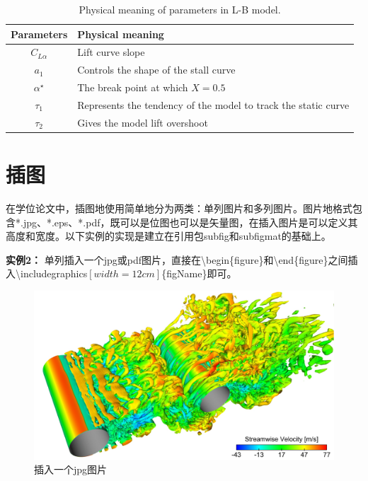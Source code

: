 \begin{table}                %
\centering
 \begin{center}
  \caption{Physical meaning of parameters in L-B model.\cite{Pattinson:2013_postall_oscillation}}
  \label{tab:LB-parameters}
  \begin{tabular}{cl}
       \\\hline
       Parameters & Physical meaning       \\\hline
       $C_{L\alpha}$ & Lift curve slope \\
       $a_{1}$ & Controls the shape of the stall curve \\
       $\alpha^{\star}$ & The break point at which $X=0.5$ \\
       $\tau_{1}$ & Represents the tendency of the model to track the static curve \\
       $\tau_{2}$ & Gives the model lift overshoot \\\hline
  \end{tabular}
 \end{center}
\end{table}

\section{插图}
\label{sec:fig}

在学位论文中，插图地使用简单地分为两类：单列图片和多列图片。图片地格式包含*.jpg、*.eps、*.pdf，既可以是位图也可以是矢量图，在插入图片是可以定义其高度和宽度。以下实例的实现是建立在引用包subfig和subfigmat的基础上。

{\bf{实例2：}} 单列插入一个jpg或pdf图片，直接在\textbackslash begin\{figure\}和\textbackslash end\{figure\}之间插入\textbackslash includegraphics$\left[width=12cm\right]$\{figName\}即可。

\begin{figure}
\centering
   \includegraphics[width=12cm]{./img/visual_jpg}
  \caption{插入一个jpg图片}
  \label{fig:visual}
\end{figure}

